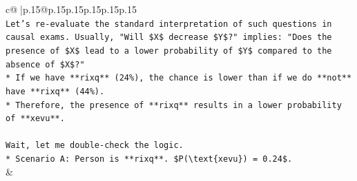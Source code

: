 \documentclass{article}
\begin{document}
{\begin{supertabular}{c@{$\;$}|p{.15\linewidth}@{}p{.15\linewidth}p{.15\linewidth}p{.15\linewidth}p{.15\linewidth}p{.15\linewidth}}
{{{\\ 
\texttt{Let's re{-}evaluate the standard interpretation of such questions in causal exams. Usually, "Will \$X\$ decrease \$Y\$?" implies: "Does the presence of \$X\$ lead to a lower probability of \$Y\$ compared to the absence of \$X\$?"} \\
\texttt{*   If we have **rixq** (24\%), the chance is lower than if we do **not** have **rixq** (44\%).} \\
\texttt{*   Therefore, the presence of **rixq** results in a lower probability of **xevu**.} \\
\\ 
\texttt{Wait, let me double{-}check the logic.} \\
\texttt{*   Scenario A: Person is **rixq**. \$P(\textbackslash{}text\{xevu\}) = 0.24\$.} \\
            }
        }
    }
    & \\ \\


\end{supertabular}}
\end{document}
